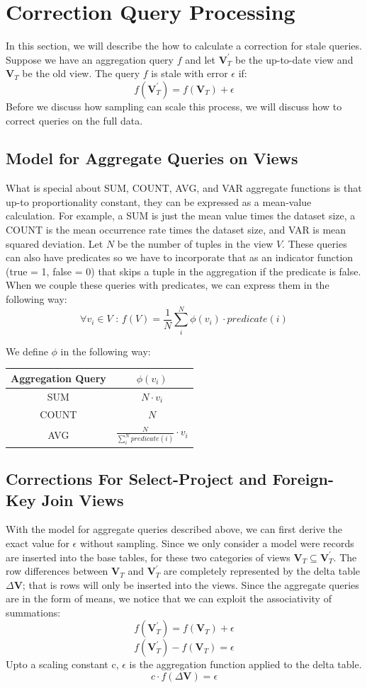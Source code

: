 \iffalse

\section{Correction Query Processing}
In this section, we will describe the how to calculate a 
correction for stale queries.
Suppose we have an aggregation query $f$ and let $\textbf{V}_{T}^{'}$ be the up-to-date view
and $\textbf{V}_{T}$ be the old view. 
The query $f$ is stale with error $\epsilon$ if:
\[
f(\textbf{V}_{T}^{'})=f(\textbf{V}_{T})+\epsilon
\]
Before we discuss how sampling can scale this process, we will discuss how to correct
queries on the full data.

\subsection{Model for Aggregate Queries on Views}
What is special about SUM, COUNT, AVG, and VAR aggregate functions
is that up-to proportionality constant, they can be expressed as a mean-value calculation.
For example, a SUM is just the mean value times the dataset size, a COUNT 
is the mean occurrence rate times the dataset size, and VAR is mean squared 
deviation.
Let $N$ be the number of tuples in the view $V$. 
These queries can also have predicates so we have to incorporate that
as an indicator function (true = 1, false = 0) that skips a tuple in the aggregation if the predicate is false. 
When we couple these queries with predicates, we can express them in the 
following way:
\[
\forall v_i \in V \text{ : } f(V)= \frac{1}{N} \sum_i^N \phi(v_i) \cdot predicate(i)
\]

We define $\phi$ in the following way:
\begin{center}
\begin{tabular}{|c|c|}
\hline 
Aggregation Query & $\phi(v_i)$\tabularnewline
\hline 
\hline 
SUM & $N \cdot v_i$\tabularnewline
\hline 
COUNT & $N$\tabularnewline
\hline 
AVG & $\frac{N}{\sum_i^N predicate(i)} \cdot v_i$\tabularnewline
\hline 
\end{tabular}
\par\end{center}

\subsection{Corrections For Select-Project and Foreign-Key Join Views}
With the model for aggregate queries described above, we can
first derive the exact value for $\epsilon$ without sampling.
Since we only consider a model were records are inserted into the
base tables, for these two categories of views $\textbf{V}_{T}\subseteq\textbf{V}_{T}^{'}$.
The row differences between $\textbf{V}_{T}$ and $\textbf{V}_{T}^{'}$
are completely represented by the delta table $\Delta\textbf{V}$;
that is rows will only be inserted into the views. 
Since the aggregate queries are in the form of means, we notice that we 
can exploit the associativity of summations:
\[
f(\textbf{V}_{T}^{'})=f(\textbf{V}_{T})+\epsilon
\]
\[
f(\textbf{V}_{T}^{'})-f(\textbf{V}_{T})=\epsilon
\]
Upto a scaling constant c, $\epsilon$ is the aggregation function
applied to the delta table. 
\[
c\cdot f(\Delta\textbf{V})=\epsilon
\]

